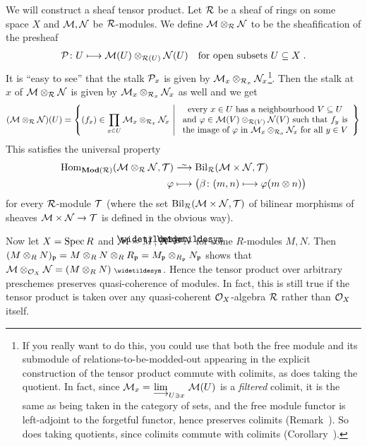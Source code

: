 \documentclass[a4paper,parskip=half,numbers=enddot, DIV=12]{scrreprt}
\begin{document}
\begin{rem}
	We will construct a sheaf tensor product. Let $\mathcal{R}$ be a sheaf of rings on some space $X$ and $\mathcal{M},\mathcal{N}$ be $\mathcal{R}$-modules. We define $\mathcal{M}\otimes_{\mathcal{R}}\mathcal{N}$ to be the sheafification of the presheaf 
	\begin{align*}
		\mathcal{P}\colon U\longmapsto \mathcal{M}(U)\otimes_{\mathcal{R}(U)}\mathcal{N}(U)\quad\text{for open subsets }U\subseteq X\;.
	\end{align*}
	It is ``easy to see'' that the stalk $\mathcal{P}_x$ is given by $\mathcal{M}_x\otimes_{\mathcal{R}_x}\mathcal{N}_x$\footnote{If you really want to do this, you could use that both the free module and its submodule of relations-to-be-modded-out appearing in the explicit construction of the tensor product commute with colimits, as does taking the quotient. In fact, since $\Mm_x=\colimit[U\ni x] \Mm(U)$ is a \emph{filtered} colimit, it is the same as being taken in the category of sets, and the free module functor is left-adjoint to the forgetful functor, hence preserves colimits (Remark~). So does taking quotients, since colimits commute with colimits (Corollary~).}. Then the stalk at $x$ of $\mathcal{M}\otimes_{\mathcal{R}}\mathcal{N}$ is given by $\mathcal{M}_x\otimes_{\mathcal{R}_x}\mathcal{N}_x$ as well and we get
	\begin{align*}
		(\mathcal{M}\otimes_{\mathcal{R}}\mathcal{N})(U)=\left\{(f_x)\in\prod_{x\in U}\mathcal{M}_x\otimes_{\mathcal{R}_x}\mathcal{N}_x\ \middle|\ \begin{array}{c}
			\text{every }x\in U\text{ has a neighbourhood }V\subseteq U\\
			\text{and }\varphi\in \mathcal{M}(V)\otimes_{\mathcal{R}(V)}\mathcal{N}(V)\text{ such that }f_y\text{ is}\\
			\text{the image of }\varphi\text{ in }\mathcal{M}_x\otimes_{\mathcal{R}_x}\mathcal{N}_x\text{ for all }y\in V
		\end{array}\right\}
	\end{align*}
	This satisfies the universal property 
	\begin{align*}
		\Hom_{\cat{Mod}(\Rr)}(\Mm\otimes_\Rr\Nn,\Tt)&\isomorphism \operatorname{Bil}_\Rr(\Mm\times \Nn,\Tt)\\
		\phi&\longmapsto\big(\beta\colon (m,n)\longmapsto \phi(m\otimes n)\big)
	\end{align*}
	for every $\mathcal{R}$-module $\mathcal{T}$ (where the set $\operatorname{Bil}_{\mathcal{R}}(\mathcal{M}\times \mathcal{N},\mathcal{T})$ of bilinear morphisms of sheaves $\Mm\times \Nn\morphism \Tt$ is defined in the obvious way).
	
	Now let $X=\operatorname{Spec} R$ and $\Mm=\snake{M}$, $\Nn=\snake{N}$ for some $R$-modules $M,N$. Then $(M\otimes_RN)_{\mathfrak{p}}=M\otimes_RN\otimes_RR_{\mathfrak{p}}=M_{\mathfrak{p}}\otimes_{R_{\mathfrak{p}}}N_{\mathfrak{p}}$ shows that $\Mm\otimes _{\Oo_X}\Nn=(M\otimes_RN)^\qcmod$. Hence the tensor product over arbitrary preschemes preserves quasi-coherence of modules. In fact, this is still true if the tensor product is taken over any quasi-coherent $\mathcal{O}_X$-algebra $\mathcal{R}$ rather than $\mathcal{O}_X$ itself.
	

\end{rem}
\end{document}
